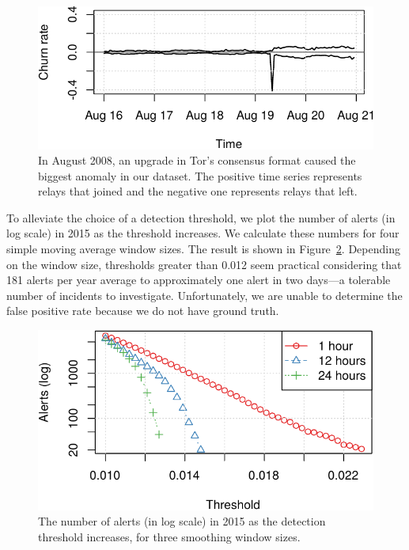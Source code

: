 \begin{figure}[t]
	\centering
	\includegraphics[width=\linewidth]{diagrams/2008-08.pdf}
	\caption{In August 2008, an upgrade in Tor's consensus format caused the
	biggest anomaly in our dataset.  The positive time series represents relays
	that joined and the negative one represents relays that left.}
	\label{fig:2008-08}
\end{figure}

To alleviate the choice of a detection threshold, we plot the number of alerts
(in log scale) in 2015 as the threshold increases.  We calculate these numbers
for four simple moving average window sizes.  The result is shown in
Figure~\ref{fig:threshold-alarm}.  Depending on the window size, thresholds
greater than 0.012 seem practical considering that 181 alerts per year average
to approximately one alert in two days---a tolerable number of incidents to
investigate.  Unfortunately, we are unable to determine the false positive rate
because we do not have ground truth.

\begin{figure}[t]
	\centering
	\includegraphics[width=0.9\linewidth]{diagrams/threshold-alarm.pdf}
	\caption{The number of alerts (in log scale) in 2015 as the detection
	threshold increases, for three smoothing window sizes.}
	\label{fig:threshold-alarm}
\end{figure}

